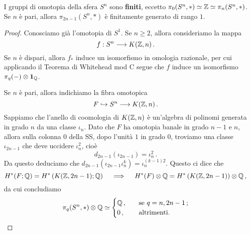 \begin{thm}[Serre]\label{serre-thm}
	I gruppi di omotopia della sfera $S^{n}$ sono \textbf{finiti},
	eccetto $\pi_{0}(S^{n}, \ast) \simeq {\mathbb Z} \simeq \pi_{n}(S^{n},\ast)$.
	Se $n$ è pari, allora $\pi_{2n-1}(S^{n},\ast)$ è finitamente generato di rango $1$.
	\begin{proof}
		Conosciamo già l'omotopia di $S^{1}$.
		Se $n \ge 2$, allora consideriamo la mappa
		\begin{equation*}
			f : S^{n} \longrightarrow K({\mathbb Z},n)\,.
		\end{equation*}
		Se $n$ è dispari, allora $f_{*}$ induce un isomorfismo
		in omologia razionale, per cui applicando il
		Teorema di Whitehead mod C segue che $f$ induce
		un isomorfismo $\pi_{q}(-) \otimes {\normalfont\textbf{1}}_{{\mathbb Q}}$.
		
		Se $n$ è pari, allora indichiamo la fibra omotopica
		\begin{equation*}
			F \hookrightarrow S^{n} \longrightarrow K({\mathbb Z},n)\,.
		\end{equation*}
		Sappiamo che  l'anello di coomologia di $K({\mathbb Z},n)$
		è un'algebra di polinomi generata in grado $n$ da una classe $\iota_{n}$.
		Dato che $F$ ha omotopia banale in grado $n-1$ e $n$, allora 
		sulla colonna $0$ della SS, dopo l'unità $1$ in grado $0$,
		troviamo una classe $\iota_{2n-1}$ che deve uccidere $\iota_{n}^{2}$,
		cioè
		\begin{equation*}
			d_{2n-1}(\iota_{2n-1}) = \iota^{2}_{n}\,.
		\end{equation*}
		Da questo deduciamo che $d_{2n-1}(\iota_{2n-1} \iota_{n}^{k}) = \iota^{(k-1)2}_{n}$.
		Questo ci dice che
		\begin{equation*}
			H^{*}(F;{\mathbb Q}) = H^{*}\left( K({\mathbb Z},2n-1);{\mathbb Q} \right)
			\quad \implies \quad 
			H^{*}(F) \otimes {\mathbb Q} = H^{*}\left( K({\mathbb Z},2n-1)\right) \otimes {\mathbb Q}\,,
		\end{equation*}
		da cui concludiamo
		\begin{equation*}
			\pi_{q}(S^{n},\ast) \otimes {\mathbb Q} \simeq
			\begin{cases}
				{\mathbb Q}\,, \quad &\text{se } q=n,2n-1\,; \\
				0\,, \quad &\text{altrimenti}.
			\end{cases}
		\end{equation*}
	\end{proof}
\end{thm}

